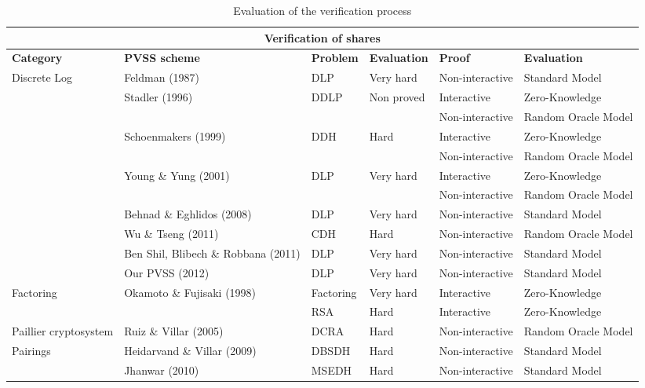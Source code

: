 \documentclass[submission,copyright,creativecommons]{eptcs}
\begin{document}
\begin{table*}[tbp] \centering \begin{tabular}{|p{2.5cm}||p{3cm}||p{1.5cm}||p{1.7cm}||p{1.6cm}||p{1.7cm}|}
\hline
\multicolumn{6}{|c|}{\textbf{Verification of shares}} \\ \hline
\textbf{Category} & \textbf{PVSS scheme} & \textbf{Problem} & \textbf{Evaluation} & \textbf{Proof} & \textbf{Evaluation} \\ \hline
\multirow{8}{2.5cm}{Discrete Log} & Feldman (1987) & DLP & Very hard & Non-interactive
& Standard Model \\ \cline{2-4}\cline{2-6}
& \multirow{2}{2.5cm}{Stadler (1996)} & \multirow{2}{*}{DDLP} & \multirow{2}{*}{Non proved} & 
Interactive & Zero-Knowledge \\ \cline{5-6}
&  &  &  & Non-interactive & Random Oracle Model \\ \cline{2-4}\cline{2-6}
& \multirow{2}{3cm}{Schoenmakers (1999)} & \multirow{2}{*}{DDH} & \multirow{2}{*}{Hard} & 
Interactive & Zero-Knowledge \\ \cline{5-6}
&  &  &  & Non-interactive & Random Oracle Model \\ \cline{2-4}\cline{2-6}
& \multirow{2}{3cm}{Young \& Yung (2001)} & \multirow{2}{*}{DLP} & \multirow{2}{*}{Very hard} & 
Interactive & Zero-Knowledge \\ \cline{5-6}
&  &  &  & Non-interactive & Random Oracle Model \\ \cline{2-4}\cline{2-6}
& Behnad \& Eghlidos (2008) & DLP & Very hard & Non-interactive & Standard
Model \\ \cline{2-6}
& Wu \& Tseng (2011) & CDH & Hard & Non-interactive & Random Oracle Model \\ 
\cline{2-6}
& Ben Shil, Blibech \& Robbana (2011) & DLP & Very hard & Non-interactive & 
Standard Model \\ \cline{2-6}
& Our PVSS (2012) & DLP & Very hard & Non-interactive & Standard Model \\ 
\hline
\multirow{2}{2.5cm}{Factoring} & \multirow{2}{3cm}{Okamoto \& Fujisaki (1998)} & Factoring & 
Very hard & Interactive & Zero-Knowledge \\ \cline{3-6}
&  & RSA & Hard & Interactive & Zero-Knowledge \\ \cline{1-4}\cline{2-6}
Paillier cryptosystem & Ruiz \& Villar (2005) & DCRA & Hard & 
Non-interactive & Random Oracle Model \\ \hline
\multirow{2}{2.5cm}{Pairings} & Heidarvand \& Villar (2009) & DBSDH & Hard & 
Non-interactive & Standard Model \\ \cline{2-6}
& Jhanwar (2010) & MSEDH & Hard & Non-interactive & Standard Model \\ \hline
\end{tabular}\caption{Evaluation of the verification process}\label{Evaluation of the
verification process}\end{table*}
\end{document}
